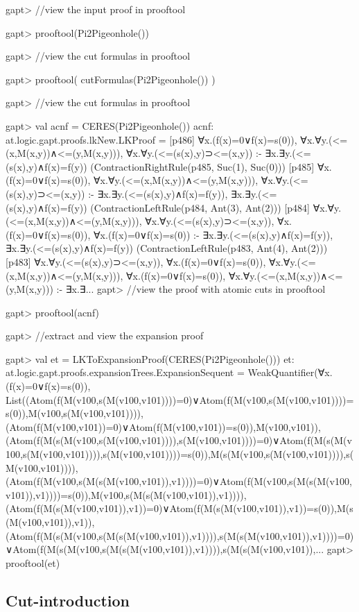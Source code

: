 \documentclass[a4paper,11pt]{article}
\begin{document}
\begin{clilisting}
gapt> //view the input proof in prooftool

gapt> prooftool(Pi2Pigeonhole())

gapt> //view the cut formulas in prooftool

gapt> prooftool( cutFormulas(Pi2Pigeonhole()) )

gapt> //view the cut formulas in prooftool

gapt> val acnf = CERES(Pi2Pigeonhole())
acnf: at.logic.gapt.proofs.lkNew.LKProof =
[p486] ∀x.(f(x)=0∨f(x)=s(0)), ∀x.∀y.(<=(x,M(x,y))∧<=(y,M(x,y))), ∀x.∀y.(<=(s(x),y)⊃<=(x,y)) :- ∃x.∃y.(<=(s(x),y)∧f(x)=f(y))    (ContractionRightRule(p485, Suc(1), Suc(0)))
[p485] ∀x.(f(x)=0∨f(x)=s(0)), ∀x.∀y.(<=(x,M(x,y))∧<=(y,M(x,y))), ∀x.∀y.(<=(s(x),y)⊃<=(x,y)) :- ∃x.∃y.(<=(s(x),y)∧f(x)=f(y)), ∃x.∃y.(<=(s(x),y)∧f(x)=f(y))    (ContractionLeftRule(p484, Ant(3), Ant(2)))
[p484] ∀x.∀y.(<=(x,M(x,y))∧<=(y,M(x,y))), ∀x.∀y.(<=(s(x),y)⊃<=(x,y)), ∀x.(f(x)=0∨f(x)=s(0)), ∀x.(f(x)=0∨f(x)=s(0)) :- ∃x.∃y.(<=(s(x),y)∧f(x)=f(y)), ∃x.∃y.(<=(s(x),y)∧f(x)=f(y))    (ContractionLeftRule(p483, Ant(4), Ant(2)))
[p483] ∀x.∀y.(<=(s(x),y)⊃<=(x,y)), ∀x.(f(x)=0∨f(x)=s(0)), ∀x.∀y.(<=(x,M(x,y))∧<=(y,M(x,y))), ∀x.(f(x)=0∨f(x)=s(0)), ∀x.∀y.(<=(x,M(x,y))∧<=(y,M(x,y))) :- ∃x.∃...
gapt> //view the proof with atomic cuts in prooftool

gapt> prooftool(acnf)

gapt> //extract and view the expansion proof

gapt> val et = LKToExpansionProof(CERES(Pi2Pigeonhole()))
et: at.logic.gapt.proofs.expansionTrees.ExpansionSequent = WeakQuantifier(∀x.(f(x)=0∨f(x)=s(0)), List((Atom(f(M(v100,s(M(v100,v101))))=0)∨Atom(f(M(v100,s(M(v100,v101))))=s(0)),M(v100,s(M(v100,v101)))), (Atom(f(M(v100,v101))=0)∨Atom(f(M(v100,v101))=s(0)),M(v100,v101)), (Atom(f(M(s(M(v100,s(M(v100,v101)))),s(M(v100,v101))))=0)∨Atom(f(M(s(M(v100,s(M(v100,v101)))),s(M(v100,v101))))=s(0)),M(s(M(v100,s(M(v100,v101)))),s(M(v100,v101)))), (Atom(f(M(v100,s(M(s(M(v100,v101)),v1))))=0)∨Atom(f(M(v100,s(M(s(M(v100,v101)),v1))))=s(0)),M(v100,s(M(s(M(v100,v101)),v1)))), (Atom(f(M(s(M(v100,v101)),v1))=0)∨Atom(f(M(s(M(v100,v101)),v1))=s(0)),M(s(M(v100,v101)),v1)), (Atom(f(M(s(M(v100,s(M(s(M(v100,v101)),v1)))),s(M(s(M(v100,v101)),v1))))=0)∨Atom(f(M(s(M(v100,s(M(s(M(v100,v101)),v1)))),s(M(s(M(v100,v101)),...
gapt> prooftool(et)

\end{clilisting}

\subsection{Cut-introduction}\label{sec.cut-introduction}
\end{document}
